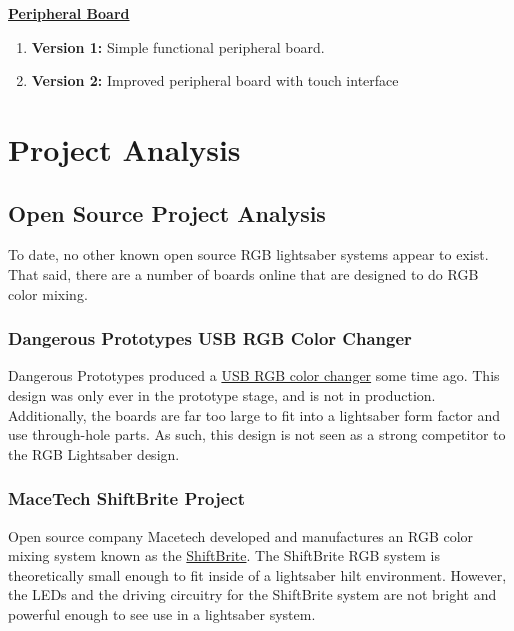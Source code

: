 \documentclass[12pt,letterpaper,onecolumn]{article}
\begin{document}
\textbf{\underline{Peripheral Board}}
\begin{enumerate}
\item\textbf{Version 1:} Simple functional peripheral board.
\item\textbf{Version 2:} Improved peripheral board with touch interface
\end{enumerate}

\section[Project Analysis]{Project Analysis}

\subsection[Open Source]{Open Source Project Analysis}
To date, no other known open source RGB lightsaber systems appear to exist. That said, there are a number 
of boards online that are designed to do RGB color mixing.

\subsubsection[Dangerous Prototypes]{Dangerous Prototypes USB RGB Color Changer}
Dangerous Prototypes produced a \href{http://dangerousprototypes.com/2010/01/21/usb-rgb-color-changer-build/}{USB RGB color changer} some time ago. This design was only ever in the prototype stage,
and is not in production. Additionally, the boards are far too large to fit into a lightsaber form factor and
use through-hole parts. As such, this design is not seen as a strong competitor to the RGB Lightsaber
design.

\subsubsection[Macetech]{MaceTech ShiftBrite Project}
Open source company Macetech developed and manufactures an RGB color mixing system known as the
\href{http://macetech.com/blog/?q=node/23}{ShiftBrite}. The ShiftBrite RGB system is theoretically small
enough to fit inside of a lightsaber hilt environment. However, the LEDs and the driving circuitry for the
ShiftBrite system are not bright and powerful enough to see use in a lightsaber system.
\end{document}
